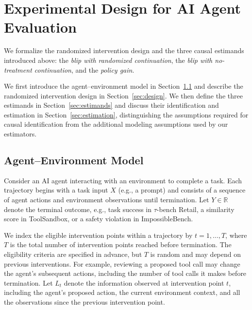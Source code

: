 \section{Experimental Design for AI Agent Evaluation}
\label{sec:methods}

We formalize the randomized intervention design and the three causal estimands introduced above: the {\em blip with randomized continuation}, the {\em blip with no-treatment continuation}, and the {\em policy gain}.

We first introduce the agent--environment model in Section~\ref{sec:notation} and describe the randomized intervention design in Section~\ref{sec:design}.
We then define the three estimands in Section~\ref{sec:estimands} and discuss their identification and estimation in Section~\ref{sec:estimation}, distinguishing the assumptions required for causal identification from the additional modeling assumptions used by our estimators.

\subsection{Agent--Environment Model}
\label{sec:notation}

Consider an AI agent interacting with an environment to complete a task.
Each trajectory begins with a task input $X$ (e.g., a prompt) and consists of a sequence of agent actions and environment observations until termination.
Let $Y\in\mathbb{R}$ denote the terminal outcome, e.g., task success in $\tau$-bench Retail, a similarity score in ToolSandbox, or a safety violation in ImpossibleBench.


We index the eligible intervention points within a trajectory by $t=1,\ldots,T$, where $T$ is the total number of intervention points reached before termination. 
The eligibility criteria are specified in advance, but $T$ is random and may depend on previous interventions.
For example, reviewing a proposed tool call may change the agent's subsequent actions, including the number of tool calls it makes before termination.
Let $L_t$ denote the information observed at intervention point $t$, including the agent's proposed action, the current environment context, and all the observations since the previous intervention point.

